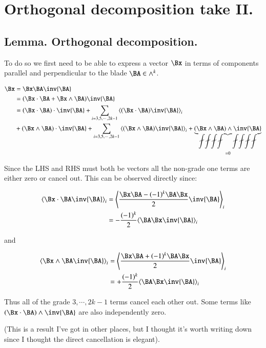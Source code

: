 \chapter{Orthogonal decomposition take II.} 
\label{chap:orthodecomp}
\date{April 1, 2008.  orthodecomp.tex}
\section{Lemma.  Orthogonal decomposition.}
To do so we first need to be able to express a vector $\Bx$ in terms
of components parallel and perpendicular to the blade $\BA \in \wedge^k$.

\begin{align*}
\Bx 
&= \Bx \BA \inv{\BA} \\
&= (\Bx \cdot \BA + \Bx \wedge \BA) \inv{\BA} \\
&= 
(\Bx \cdot \BA) \cdot \inv{\BA}
+ \sum_{i=3,5,\cdots,2k-1} \gpgrade{(\Bx \cdot \BA) \inv{\BA}}{i} \\
&+ 
(\Bx \wedge \BA) \cdot \inv{\BA}
+ \sum_{i=3,5,\cdots,2k-1} \gpgrade{(\Bx \wedge \BA) \inv{\BA}}{i} 
+ \underbrace{(\Bx \wedge \BA) \wedge \inv{\BA}}_{=0}
\end{align*}

Since the LHS and RHS must both be vectors all the non-grade one terms
are either zero or cancel out.  This can be observed directly since:

\begin{align*}
\gpgrade{\Bx \cdot \BA \inv{\BA}}{i}
&= \gpgrade{ \frac{\Bx \BA - (-1)^{k}\BA\Bx}{2}\inv{\BA} }{i}  \\
&= -\frac{(-1)^{k}}{2} \gpgrade{ \BA\Bx \inv{\BA} }{i}  \\
\end{align*}

and

\begin{align*}
\gpgrade{\Bx \wedge \BA \inv{\BA}}{i} 
&= \gpgrade{ \frac{\Bx \BA + (-1)^{k}\BA\Bx}{2}\inv{\BA} }{i}  \\
&= +\frac{(-1)^{k}}{2} \gpgrade{ \BA\Bx \inv{\BA} }{i}  \\
\end{align*}

Thus all of the grade $3, \cdots ,2k-1$ terms cancel each other out.  Some terms
like $(\Bx \cdot \BA) \wedge \inv{\BA}$ are also independently zero.

(This is a result I've got in other places, but I thought it's worth
 writing down since I thought the direct cancellation is elegant).
